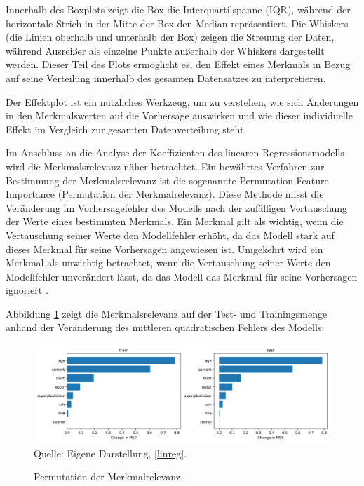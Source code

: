 Innerhalb des Boxplots zeigt die Box die Interquartilspanne (IQR), während der horizontale Strich in der Mitte der Box den Median repräsentiert. Die Whiskers 
(die Linien oberhalb und unterhalb der Box) zeigen die Streuung der Daten, während Ausreißer als einzelne Punkte außerhalb der Whiskers 
dargestellt werden. Dieser Teil des Plots ermöglicht es, den Effekt eines Merkmals in Bezug auf seine Verteilung innerhalb 
des gesamten Datensatzes zu interpretieren.

Der Effektplot ist ein nützliches Werkzeug, um zu verstehen, wie sich Änderungen in den Merkmalswerten auf die 
Vorhersage auswirken und wie dieser individuelle Effekt im Vergleich zur gesamten Datenverteilung steht.

Im Anschluss an die Analyse der Koeffizienten des linearen Regressionsmodells wird 
die Merkmalsrelevanz näher betrachtet. Ein bewährtes Verfahren zur Bestimmung der 
Merkmalsrelevanz ist die sogenannte Permutation Feature Importance (Permutation der Merkmalrelevanz). 
Diese Methode misst die Veränderung im Vorhersagefehler des Modells nach der 
zufälligen Vertauschung der Werte eines bestimmten Merkmals. 
Ein Merkmal gilt als wichtig, wenn die Vertauschung seiner Werte den Modellfehler erhöht, 
da das Modell stark auf dieses Merkmal für seine Vorhersagen angewiesen ist. 
Umgekehrt wird ein Merkmal als unwichtig betrachtet, wenn die Vertauschung seiner Werte 
den Modellfehler unverändert lässt, da das Modell das Merkmal für seine Vorhersagen ignoriert \cite[S. 157]{Molnar_2022}. 

Abbildung \ref{pic:permutation} zeigt die Merkmalsrelevanz auf der Test- und Trainingsmenge 
anhand der Veränderung des mittleren quadratischen Fehlers des Modells:

\begin{figure}[!h]
    \caption{Permutation der Merkmalrelevanz.}
    \includegraphics[width=1\textwidth]{../scripts/images/permutation_importance.png}
    Quelle: Eigene Darstellung, \ref{linreg}.
    \label{pic:permutation}
\end{figure}

